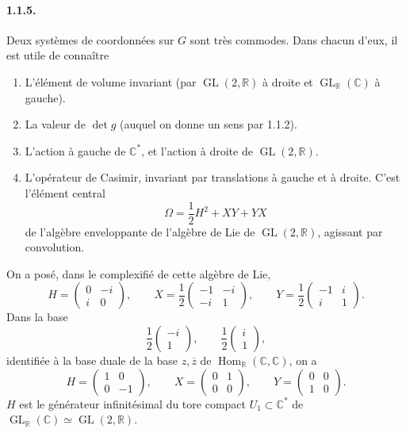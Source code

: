 \documentclass[10pt,a4paper]{article}
\providecommand{\GL}{\operatorname{GL}}
\providecommand{\Hom}{\operatorname{Hom}}
\providecommand{\R}{\mathbb R}
\providecommand{\C}{\mathbb C}
\begin{document}
\paragraph{1.1.5.} Deux systèmes de coordonnées sur \(G\) sont très commodes. Dans chacun d'eux, il est utile de connaître
\begin{enumerate}[label=(\Alph*)]
\item L'élément de volume invariant (par \(\GL(2,\R)\) à droite et \(\GL_{\R}(\C)\) à gauche).
\item La valeur de \(\det g\) (auquel on donne un sens par 1.1.2).
\item L'action à gauche de \(\C^*\), et l'action à droite de \(\GL(2,\R)\).
\item L'opérateur de Casimir, invariant par translations à gauche et à droite. C'est l'élément central
\[
\Omega=\frac12H^2+XY+YX
\]
de l'algèbre enveloppante de l'algèbre de Lie de \(\GL(2,\R)\), agissant par convolution.
\end{enumerate}
On a posé, dans le complexifié de cette algèbre de Lie,
\[
H=\begin{pmatrix}0&-i\\ i&0\end{pmatrix},\qquad
X=\frac12\begin{pmatrix}-1&-i\\ -i&1\end{pmatrix},\qquad
Y=\frac12\begin{pmatrix}-1&i\\ i&1\end{pmatrix}.
\]
Dans la base
\[
\frac12\begin{pmatrix}-i\\1\end{pmatrix},\qquad \frac12\begin{pmatrix}i\\1\end{pmatrix},
\]
identifiée à la base duale de la base \(z,\overline z\) de \(\Hom_{\R}(\C,\C)\), on a
\[
H=\begin{pmatrix}1&0\\0&-1\end{pmatrix},\qquad
X=\begin{pmatrix}0&1\\0&0\end{pmatrix},\qquad
Y=\begin{pmatrix}0&0\\1&0\end{pmatrix}.
\]
\(H\) est le générateur infinitésimal du tore compact \(U_1\subset\C^*\) de \(\GL_{\R}(\C)\simeq\GL(2,\R)\).
\end{document}
